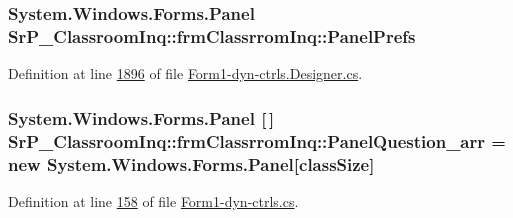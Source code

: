 \hypertarget{class_sr_p___classroom_inq_1_1frm_classrrom_inq_aac0efdb76f2989a17842359cc1a15ec9}{
\subsubsection[{\-Panel\-Prefs}]{\setlength{\rightskip}{0pt plus 5cm}\-System.\-Windows.\-Forms.\-Panel {\bf \-Sr\-P\-\_\-\-Classroom\-Inq\-::frm\-Classrrom\-Inq\-::\-Panel\-Prefs}}}
\label{class_sr_p___classroom_inq_1_1frm_classrrom_inq_aac0efdb76f2989a17842359cc1a15ec9}


\-Definition at line \hyperlink{_form1-dyn-ctrls_8_designer_8cs_source_l01896}{1896} of file \hyperlink{_form1-dyn-ctrls_8_designer_8cs_source}{\-Form1-\/dyn-\/ctrls.\-Designer.\-cs}.

\hypertarget{class_sr_p___classroom_inq_1_1frm_classrrom_inq_a5c89025435cd16c638fbc91999b74f80}{
\subsubsection[{\-Panel\-Question\-\_\-arr}]{\setlength{\rightskip}{0pt plus 5cm}\-System.\-Windows.\-Forms.\-Panel \mbox{[}$\,$\mbox{]} {\bf \-Sr\-P\-\_\-\-Classroom\-Inq\-::frm\-Classrrom\-Inq\-::\-Panel\-Question\-\_\-arr} = new \-System.\-Windows.\-Forms.\-Panel\mbox{[}{\bf class\-Size}\mbox{]}}}
\label{class_sr_p___classroom_inq_1_1frm_classrrom_inq_a5c89025435cd16c638fbc91999b74f80}


\-Definition at line \hyperlink{_form1-dyn-ctrls_8cs_source_l00158}{158} of file \hyperlink{_form1-dyn-ctrls_8cs_source}{\-Form1-\/dyn-\/ctrls.\-cs}.

